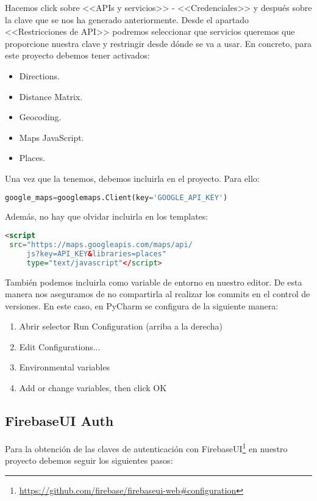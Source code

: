 Hacemos click sobre <<APIs y servicios>> - <<Credenciales>> y después sobre la clave que se nos ha generado anteriormente. Desde el apartado <<Restricciones de API>> podremos seleccionar que servicios queremos que proporcione nuestra clave y restringir desde dónde se va a usar. En concreto, para este proyecto debemos tener activados:
\begin{itemize}
	\item Directions.
	\item Distance Matrix.
	\item Geocoding.
	\item Maps JavaScript.
	\item Places.
\end{itemize}


Una vez que la tenemos, debemos incluirla en el proyecto. Para ello:
\renewcommand{\lstlistingname}{Google Key}%
\renewcommand{\lstlistlistingname}{List of \lstlistingname s}
\begin{lstlisting}[language=python,caption={Añadir \texttt{API\_KEY}}]
google_maps=googlemaps.Client(key='GOOGLE_API_KEY')
\end{lstlisting}

Además, no hay que olvidar incluirla en los templates:
\begin{lstlisting}[language=html,caption={Añadir \texttt{API\_KEY} a los templates}]
<script
 src="https://maps.googleapis.com/maps/api/
	 js?key=API_KEY&libraries=places" 
	 type="text/javascript"</script>
\end{lstlisting}

También podemos incluirla como variable de entorno en nuestro editor. De esta manera nos aseguramos de no compartirla al realizar los commits en el control de versiones. En este caso, en PyCharm se configura de la siguiente manera:
\begin{enumerate}
\item Abrir selector Run Configuration (arriba a la derecha)
\item Edit Configurations...
\item Environmental variables
\item Add or change variables, then click OK 
\end{enumerate}


\subsection{FirebaseUI Auth}
Para la obtención de las claves de autenticación con FirebaseUI\footnote{\url{https://github.com/firebase/firebaseui-web\#configuration}} en nuestro proyecto debemos seguir los siguientes pasos:

